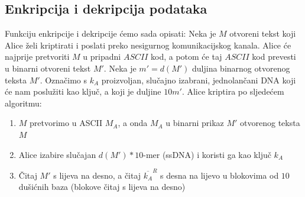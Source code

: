 \documentclass[a4paper,oneside,12pt]{memoir} %
\begin{document}
\begin{spacing}{1.5}
\section{Enkripcija i dekripcija podataka}
\label{sec:EDDNA}
Funkciju enkripcije i dekripcije ćemo sada opisati:
Neka je $M$ otvoreni tekst koji Alice želi kriptirati i poslati preko nesigurnog komunikacijskog kanala. Alice će najprije pretvoriti $M$ u pripadni $ASCII$ kod, a potom će taj $ASCII$ kod prevesti u binarni otvoreni tekst $M'$. Neka je $m'=d(M')$ duljina binarnog otvorenog teksta $M'$. Označimo s $k_A$ proizvoljan, slučajno izabrani, jednolančani DNA koji će nam poslužiti kao ključ, a koji je duljine $10m'$. Alice kriptira po sljedećem algoritmu:
\begin{enumerate}
	\item $M$ pretvorimo u ASCII $M_A$, a onda $M_A$ u binarni prikaz $M'$ otvorenog teksta $M$
	\item Alice izabire slučajan $d(M')*10$-mer (ssDNA) i koristi ga kao ključ $k_A$
	\item Čitaj $M'$ s lijeva na desno, a čitaj $\overline{k_A}^R$ s  desna na lijevo u blokovima od $10$ dušićnih baza (blokove čitaj s lijeva na desno)
	

\end{enumerate}
\end{spacing}
\end{document}
